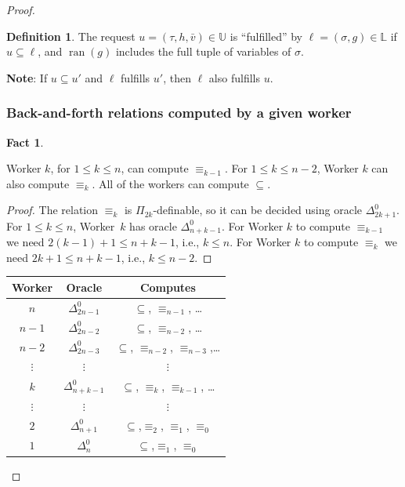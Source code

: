 \documentclass{article}
\DeclareMathOperator{\ran}{ran}
\theoremstyle{definition}
\newtheorem{defn}[thm]{Definition}
\newtheorem{fact}[thm]{Fact}
\begin{document}
\begin{proof}
\begin{enumerate}
		\end{enumerate} 
		
		\begin{defn}
			
			The request $u = (\tau,h,\bar{v})\in\mathbb{U}$ is ``fulfilled'' by $\ell = (\sigma,g)\in\mathbb{L}$ if $u\subseteq\ell$, and $\ran(g)$ includes the full tuple of variables of $\sigma$. 
			
		\end{defn} 
		
		\smallskip
		
\noindent
		\textbf{Note}:  If $u\subseteq u'$ and $\ell$ fulfills $u'$, then $\ell$ also fulfills $u$.
		
		\subsubsection{Back-and-forth relations computed by a given worker} 
		
		\begin{fact}\label{fact}
			
			Worker $k$, for $1\leq k \leq n$, can compute $\equiv_{k-1}$. For $1\leq k \leq n-2$, Worker $k$ can also compute $\equiv_k$. All of the workers can compute $\subseteq$.
			
		\end{fact}
		
		\begin{proof}
			
			The relation $\equiv_k$ is $\Pi_{2k}$-definable, so it can be decided using oracle $\Delta^0_{2k+1}$. For $1\leq k\leq n$, Worker~$k$ has oracle $\Delta^0_{n+k-1}$. For Worker $k$ to compute $\equiv_{k-1}$ we need $2(k-1)+1\leq n+k-1$, i.e., $k\leq n$. For Worker $k$ to compute $\equiv_k$ we need $2k+1\leq n+k-1$, i.e., $k\leq n-2$.
		\end{proof}
		
		\begin{center}
			\begin{tabular}{|c|c|c|}
				\hline
				Worker & Oracle & Computes \\
				\hline
				$n$ & $\Delta^0_{2n-1}$ & $\subseteq$, $\equiv_{n-1}$, \ldots \\
				$n-1$ & $\Delta^0_{2n-2}$ & $\subseteq$, $\equiv_{n-2}$, \ldots \\
				$n-2$ & $\Delta^0_{2n-3}$ & $\subseteq$, $\equiv_{n-2}$, $\equiv_{n-3}$,\ldots \\
				$\vdots$ & $\vdots$ & $\vdots$ \\
				$k$ & $\Delta^0_{n+k-1}$ & $\subseteq$, $\equiv_k$, $\equiv_{k-1}$, \ldots \\
				$\vdots$ & $\vdots$ & $\vdots$ \\
				$2$ & $\Delta^0_{n+1}$ & $\subseteq$,$\equiv_2$, $\equiv_1$, $\equiv_0$ \\
				$1$ & $\Delta^0_n$ & $\subseteq$,$\equiv_1$, $\equiv_0$ \\
				\hline
			\end{tabular}
		\end{center}
		

\end{proof}
\end{document}
